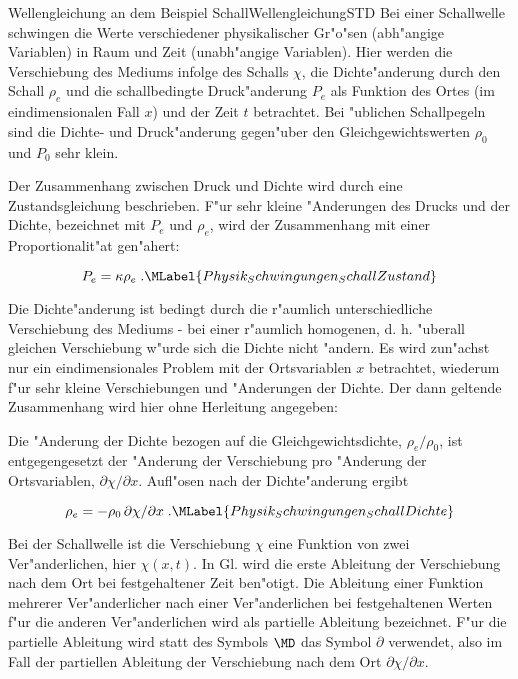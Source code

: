 \begin{MXContent}{Wellengleichung an dem Beispiel Schall}{Wellengleichung}{STD}%
Bei einer Schallwelle schwingen die Werte verschiedener physikalischer Gr"o"sen (abh"angige Variablen) in Raum und Zeit (unabh"angige Variablen). Hier werden die Verschiebung des Mediums infolge des Schalls $\chi$, die Dichte"anderung durch den Schall $\rho_e$ und die schallbedingte Druck"anderung $P_e$ als Funktion des Ortes (im eindimensionalen Fall $x$) und der Zeit $t$ betrachtet. Bei "ublichen Schallpegeln sind die Dichte- und Druck"anderung gegen"uber den Gleichgewichtswerten $\rho_0$ und $P_0$ sehr klein. 

\begin{MInfo}
Der Zusammenhang zwischen Druck und Dichte wird durch eine Zustandsgleichung beschrieben. F"ur sehr kleine "Anderungen des Drucks und der Dichte, bezeichnet mit $P_e$ und $\rho_e$, wird der Zusammenhang mit einer Proportionalit"at gen"ahert:

\begin{equation}
  P_e = \kappa \rho_e\; .\MLabel{Physik_Schwingungen_SchallZustand}
\end{equation}

\end{MInfo}

Die Dichte"anderung ist bedingt durch die r"aumlich unterschiedliche Verschiebung des Mediums - bei einer r"aumlich homogenen, d. h. "uberall gleichen Verschiebung w"urde sich die Dichte nicht "andern. Es wird zun"achst nur ein eindimensionales Problem mit der Ortsvariablen $x$ betrachtet, wiederum f"ur sehr kleine Verschiebungen und "Anderungen der Dichte. Der dann geltende Zusammenhang wird hier ohne Herleitung angegeben:

\begin{MInfo}
Die "Anderung der Dichte bezogen auf die Gleichgewichtsdichte, $\rho_e / \rho_0$, ist entgegengesetzt der "Anderung der Verschiebung pro "Anderung der Ortsvariablen, $\partial \chi / \partial x$. Auf\/l"osen nach der Dichte"anderung ergibt

\begin{equation}
  \rho_e = -\rho_0 \, \partial \chi / \partial x\; .\MLabel{Physik_Schwingungen_SchallDichte}
\end{equation}
\end{MInfo}

Bei der Schallwelle ist die Verschiebung $\chi$ eine Funktion von zwei Ver"anderlichen, hier $\chi(x,t)$. In Gl.  wird die erste Ableitung der Verschiebung nach dem Ort bei festgehaltener Zeit ben"otigt. Die Ableitung einer Funktion mehrerer Ver"anderlicher nach einer Ver"anderlichen bei festgehaltenen Werten f"ur die anderen Ver"anderlichen wird als partielle Ableitung bezeichnet. F"ur die partielle Ableitung wird statt des Symbols $\MD$ das Symbol $\partial$ verwendet, also im Fall der partiellen Ableitung der Verschiebung nach dem Ort $\partial \chi / \partial x$. 


\end{MXContent}
